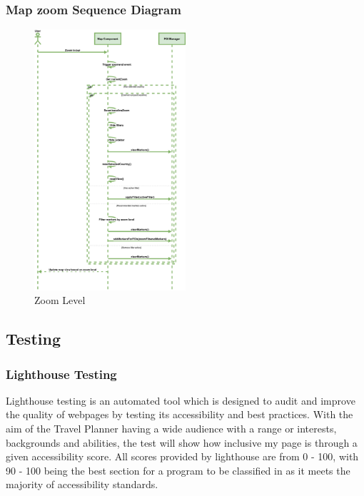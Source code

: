 \documentclass[]{project_final}
\begin{document}
\subsubsection{Map zoom Sequence Diagram}

\begin{figure}[ht!]
    \centering
    \includegraphics[width=0.5\textwidth]{TPZoomSequenecediagram.png}
    \vspace*{0.0cm}
    \caption{Zoom Level}
    \label{fig:1}
\end{figure}



\subsection{Testing}
\subsubsection{Lighthouse Testing}
Lighthouse testing is an automated tool which is designed to audit and improve the quality of webpages by testing its accessibility and best practices. With the aim of the Travel Planner having a wide audience with a range or interests, backgrounds and abilities, the test will show how inclusive my page is through a given accessibility score.
All scores provided by lighthouse are from 0 - 100, with 90 - 100 being the best section for a program to be classified in as it meets the majority of accessibility standards.
\end{document}

